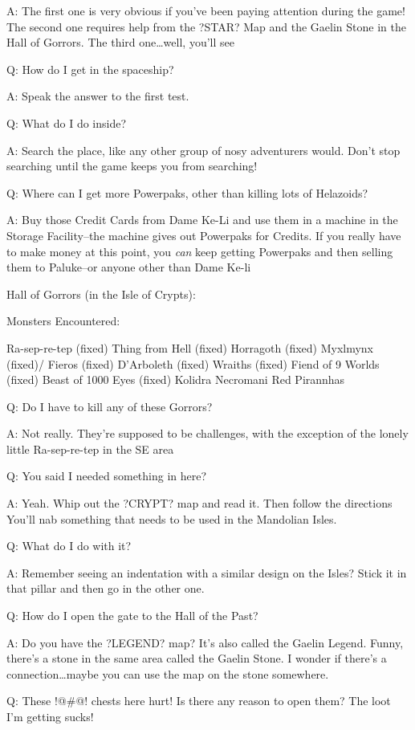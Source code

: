 \documentclass[12pt]{article}
\begin{document}
A: The first one is very obvious if you've been paying attention during
the game! The second one requires help from the ?STAR? Map and the
Gaelin Stone in the Hall of Gorrors. The third one\ldots{}well, you'll
see

Q: How do I get in the spaceship?

A: Speak the answer to the first test.

Q: What do I do inside?

A: Search the place, like any other group of nosy adventurers would.
Don't stop searching until the game keeps you from searching!

Q: Where can I get more Powerpaks, other than killing lots of Helazoids?

A: Buy those Credit Cards from Dame Ke-Li and use them in a machine in
the Storage Facility--the machine gives out Powerpaks for Credits. If
you really have to make money at this point, you \emph{can} keep getting
Powerpaks and then selling them to Paluke--or anyone other than Dame
Ke-li

Hall of Gorrors (in the Isle of Crypts):

Monsters Encountered:

Ra-sep-re-tep (fixed) Thing from Hell (fixed) Horragoth (fixed) Myxlmynx
(fixed)/ Fieros (fixed) D'Arboleth (fixed) Wraiths (fixed) Fiend of 9
Worlds (fixed) Beast of 1000 Eyes (fixed) Kolidra Necromani Red
Pirannhas

Q: Do I have to kill any of these Gorrors?

A: Not really. They're supposed to be challenges, with the exception of
the lonely little Ra-sep-re-tep in the SE area

Q: You said I needed something in here?

A: Yeah. Whip out the ?CRYPT? map and read it. Then follow the
directions You'll nab something that needs to be used in the Mandolian
Isles.

Q: What do I do with it?

A: Remember seeing an indentation with a similar design on the Isles?
Stick it in that pillar and then go in the other one.

Q: How do I open the gate to the Hall of the Past?

A: Do you have the ?LEGEND? map? It's also called the Gaelin Legend.
Funny, there's a stone in the same area called the Gaelin Stone. I
wonder if there's a connection\ldots{}maybe you can use the map on the
stone somewhere.

Q: These !@\#@! chests here hurt! Is there any reason to open them? The
loot I'm getting sucks!
\end{document}
